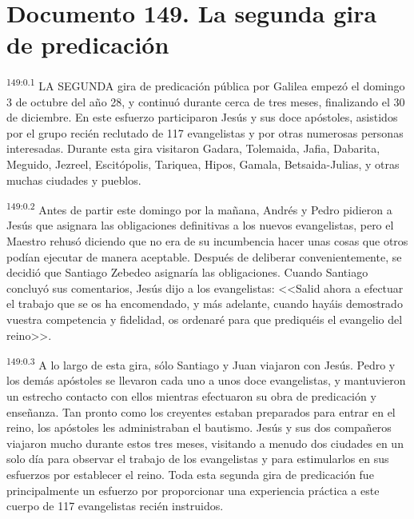 \chapter{Documento 149. La segunda gira de predicación}
\par 
\textsuperscript{149:0.1} LA SEGUNDA gira de predicación pública por Galilea empezó el domingo 3 de octubre del año 28, y continuó durante cerca de tres meses, finalizando el 30 de diciembre. En este esfuerzo participaron Jesús y sus doce apóstoles, asistidos por el grupo recién reclutado de 117 evangelistas y por otras numerosas personas interesadas. Durante esta gira visitaron Gadara, Tolemaida, Jafia, Dabarita, Meguido, Jezreel, Escitópolis, Tariquea, Hipos, Gamala, Betsaida-Julias, y otras muchas ciudades y pueblos.

\par 
\textsuperscript{149:0.2} Antes de partir este domingo por la mañana, Andrés y Pedro pidieron a Jesús que asignara las obligaciones definitivas a los nuevos evangelistas, pero el Maestro rehusó diciendo que no era de su incumbencia hacer unas cosas que otros podían ejecutar de manera aceptable. Después de deliberar convenientemente, se decidió que Santiago Zebedeo asignaría las obligaciones. Cuando Santiago concluyó sus comentarios, Jesús dijo a los evangelistas: <<Salid ahora a efectuar el trabajo que se os ha encomendado, y más adelante, cuando hayáis demostrado vuestra competencia y fidelidad, os ordenaré para que prediquéis el evangelio del reino>>.

\par 
\textsuperscript{149:0.3} A lo largo de esta gira, sólo Santiago y Juan viajaron con Jesús. Pedro y los demás apóstoles se llevaron cada uno a unos doce evangelistas, y mantuvieron un estrecho contacto con ellos mientras efectuaron su obra de predicación y enseñanza. Tan pronto como los creyentes estaban preparados para entrar en el reino, los apóstoles les administraban el bautismo. Jesús y sus dos compañeros viajaron mucho durante estos tres meses, visitando a menudo dos ciudades en un solo día para observar el trabajo de los evangelistas y para estimularlos en sus esfuerzos por establecer el reino. Toda esta segunda gira de predicación fue principalmente un esfuerzo por proporcionar una experiencia práctica a este cuerpo de 117 evangelistas recién instruidos.

